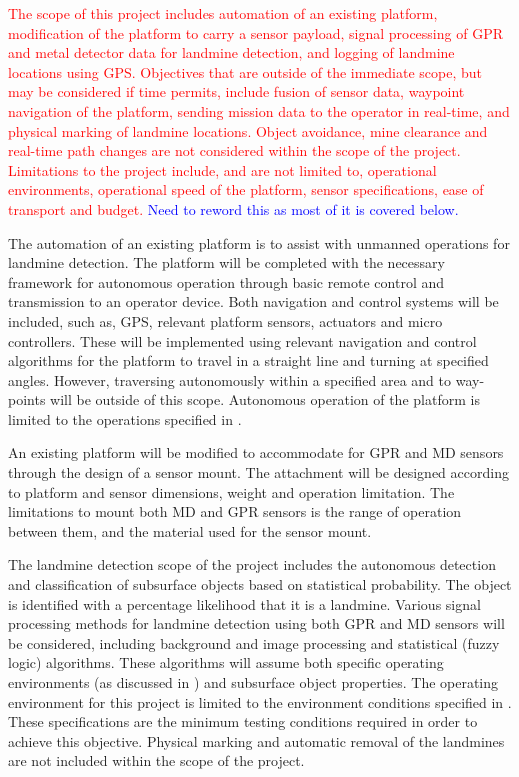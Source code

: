 \documentclass[main.tex]{subfiles}
\begin{document}
\textcolor{red}{The scope of this project includes automation of an existing platform, modification of the platform to carry a sensor payload, signal processing of GPR and metal detector data for landmine detection, and logging of landmine locations using GPS. Objectives that are outside of the immediate scope, but may be considered if time permits, include fusion of sensor data, waypoint navigation of the platform, sending mission data to the operator in real-time, and physical marking of landmine locations. Object avoidance, mine clearance and real-time path changes are not considered within the scope of the project. Limitations to the project include, and are not limited to, operational environments, operational speed of the platform, sensor specifications, ease of transport and budget.} 
\textcolor{blue}{Need to reword this as most of it is covered below.} 

The automation of an existing platform is to assist with unmanned operations for landmine detection. The platform will be completed with the necessary framework for autonomous operation through basic remote control and transmission to an operator device. Both navigation and control systems will be included, such as, GPS, relevant platform sensors, actuators and micro controllers. These will be implemented using relevant navigation and control algorithms for the platform to travel in a straight line and turning at specified angles. However, traversing autonomously within a specified area and to way-points will be outside of this scope. Autonomous operation of the platform is limited to the operations specified in . 

An existing platform will be modified to accommodate for GPR and MD sensors through the design of a sensor mount. The attachment will be designed according to platform and sensor dimensions, weight and operation limitation. The limitations to mount both MD and GPR sensors is the range of operation between them, and the material used for the sensor mount.

The landmine detection scope of the project includes the autonomous detection and classification of subsurface objects based on statistical probability. The object is identified with a percentage likelihood that it is a landmine. Various signal processing methods for landmine detection using both GPR and MD sensors will be considered, including background and image processing and statistical (fuzzy logic) algorithms. These algorithms will assume both specific operating environments (as discussed in ) and subsurface object properties. The operating environment for this project is limited to the environment conditions specified in . These specifications are the minimum testing conditions required in order to achieve this objective. Physical marking and automatic removal of the landmines are not included within the scope of the project. 
\end{document}
